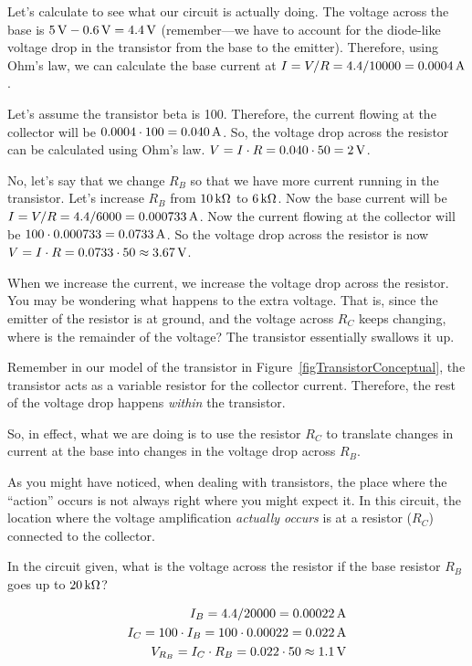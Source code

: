 Let's calculate to see what our circuit is actually doing.
The voltage across the base is $5\,\si{\volt} - 0.6\,\si{\volt} = 4.4\,\si{\volt}$ (remember---we have to account for the diode-like voltage drop in the transistor from the base to the emitter).
Therefore, using Ohm's law, we can calculate the base current at $I = V / R = 4.4 / 10000 = 0.0004\,\si{\ampere}$.

Let's assume the transistor beta is 100.
Therefore, the current flowing at the collector will be $0.0004 \cdot 100 = 0.040\,\si{\ampere}$.
So, the voltage drop across the resistor can be calculated using Ohm's law.
$V = I\cdot R = 0.040 \cdot 50 = 2\,\si{\volt}$.

No, let's say that we change $R_B$ so that we have more current running in the transistor.
Let's increase $R_B$ from $10\,\si{\kilo\ohm}$ to $6\,\si{\kilo\ohm}$.
Now the base current will be $I = V / R = 4.4 / 6000 = 0.000733\,\si{\ampere}$.
Now the current flowing at the collector will be $100 \cdot 0.000733 = 0.0733\,\si{\ampere}$.
So the voltage drop across the resistor is now $V = I \cdot R = 0.0733 \cdot 50 \approx 3.67\,\si{\volt}$.

When we increase the current, we increase the voltage drop across the resistor.
You may be wondering what happens to the extra voltage.
That is, since the emitter of the resistor is at ground, and the voltage across $R_C$ keeps changing, where is the remainder of the voltage?
The transistor essentially swallows it up.

Remember in our model of the transistor in Figure~\ref{figTransistorConceptual}, the transistor acts as a variable resistor for the collector current.
Therefore, the rest of the voltage drop happens \emph{within} the transistor.

So, in effect, what we are doing is to use the resistor $R_C$ to translate changes in current at the base into changes in the voltage drop across $R_B$.

As you might have noticed, when dealing with transistors, the place where the ``action'' occurs is not always right where you might expect it.
In this circuit, the location where the voltage amplification \emph{actually occurs} is at a resistor ($R_C$) connected to the collector.

\begin{exampleprob}
In the circuit given, what is the voltage across the resistor if the base resistor $R_B$ goes up to $20\,\si{\kilo\ohm}$?

\begin{align*}
I_B = 4.4 / 20000 = 0.00022 \,\si{\ampere} \\
I_C = 100 \cdot I_B = 100\cdot 0.00022 = 0.022\,\si{\ampere} \\
V_{R_B} = I_C \cdot R_B = 0.022 \cdot 50 \approx 1.1\,\si{\volt}
\end{align*}
\end{exampleprob}

